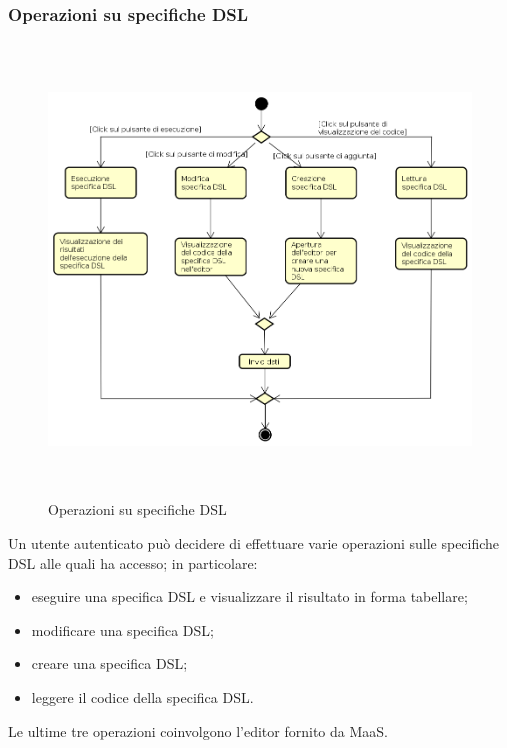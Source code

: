 \subsubsection{Operazioni su specifiche DSL}
\begin{figure}[H]
\begin{center}
\includegraphics[height=12cm]{res/sections/backend/activities/operazioniDSL.png}
\caption{Operazioni su specifiche DSL}
\end{center}
\end{figure}
Un utente autenticato può decidere di effettuare varie operazioni sulle specifiche DSL alle quali ha accesso; in particolare:
\begin{itemize}
\item eseguire una specifica DSL e visualizzare il risultato in forma tabellare;
\item modificare una specifica DSL;
\item creare una specifica DSL;
\item leggere il codice della specifica DSL.
\end{itemize}
Le ultime tre operazioni coinvolgono l'editor fornito da MaaS.
